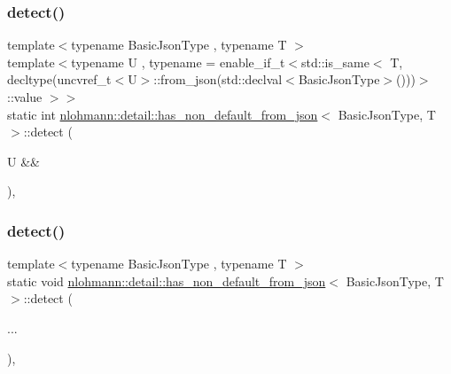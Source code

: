 \subsubsection{\texorpdfstring{detect()}{detect()}\hspace{0.1cm}{\footnotesize\ttfamily [1/2]}}
{\footnotesize\ttfamily template$<$typename Basic\+Json\+Type , typename T $>$ \\
template$<$typename U , typename  = enable\+\_\+if\+\_\+t$<$std\+::is\+\_\+same$<$                                   T, decltype(uncvref\+\_\+t$<$\+U$>$\+::from\+\_\+json(std\+::declval$<$\+Basic\+Json\+Type$>$()))$>$\+::value $>$$>$ \\
static int \hyperlink{structnlohmann_1_1detail_1_1has__non__default__from__json}{nlohmann\+::detail\+::has\+\_\+non\+\_\+default\+\_\+from\+\_\+json}$<$ Basic\+Json\+Type, T $>$\+::detect (\begin{DoxyParamCaption}\item[{U \&\&}]{ }\end{DoxyParamCaption})\hspace{0.3cm}{\ttfamily [static]}, {\ttfamily [private]}}

\mbox{\label{structnlohmann_1_1detail_1_1has__non__default__from__json_aa9d6fc482c9b96cf5ffbba95d4afd01a}} 
\subsubsection{\texorpdfstring{detect()}{detect()}\hspace{0.1cm}{\footnotesize\ttfamily [2/2]}}
{\footnotesize\ttfamily template$<$typename Basic\+Json\+Type , typename T $>$ \\
static void \hyperlink{structnlohmann_1_1detail_1_1has__non__default__from__json}{nlohmann\+::detail\+::has\+\_\+non\+\_\+default\+\_\+from\+\_\+json}$<$ Basic\+Json\+Type, T $>$\+::detect (\begin{DoxyParamCaption}\item[{}]{... }\end{DoxyParamCaption})\hspace{0.3cm}{\ttfamily [static]}, {\ttfamily [private]}}




